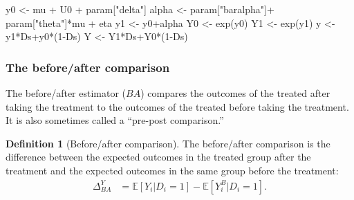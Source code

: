 \documentclass[
]{book}
\newenvironment{Shaded}{\begin{snugshade}}{\end{snugshade}}
\newcommand{\DecValTok}[1]{\textcolor[rgb]{0.00,0.00,0.81}{#1}}
\newcommand{\FunctionTok}[1]{\textcolor[rgb]{0.00,0.00,0.00}{#1}}
\newcommand{\NormalTok}[1]{#1}
\newcommand{\OtherTok}[1]{\textcolor[rgb]{0.56,0.35,0.01}{#1}}
\newcommand{\SpecialCharTok}[1]{\textcolor[rgb]{0.00,0.00,0.00}{#1}}
\newcommand{\StringTok}[1]{\textcolor[rgb]{0.31,0.60,0.02}{#1}}
\newcommand{\esp}[1]{\mathbb{E}[ #1 ]}
\theoremstyle{definition}
\newtheorem{definition}{Definition}[chapter]
\theoremstyle{definition}
\theoremstyle{definition}
\theoremstyle{definition}
\theoremstyle{remark}
\begin{document}
\begin{Shaded}
\begin{Highlighting}[]
\NormalTok{y0 }\OtherTok{\textless{}{-}}\NormalTok{ mu }\SpecialCharTok{+}\NormalTok{  U0 }\SpecialCharTok{+}\NormalTok{ param[}\StringTok{"delta"}\NormalTok{]}
\NormalTok{alpha }\OtherTok{\textless{}{-}}\NormalTok{ param[}\StringTok{"baralpha"}\NormalTok{]}\SpecialCharTok{+}\NormalTok{  param[}\StringTok{"theta"}\NormalTok{]}\SpecialCharTok{*}\NormalTok{mu }\SpecialCharTok{+}\NormalTok{ eta}
\NormalTok{y1 }\OtherTok{\textless{}{-}}\NormalTok{ y0}\SpecialCharTok{+}\NormalTok{alpha}
\NormalTok{Y0 }\OtherTok{\textless{}{-}} \FunctionTok{exp}\NormalTok{(y0)}
\NormalTok{Y1 }\OtherTok{\textless{}{-}} \FunctionTok{exp}\NormalTok{(y1)}
\NormalTok{y }\OtherTok{\textless{}{-}}\NormalTok{ y1}\SpecialCharTok{*}\NormalTok{Ds}\SpecialCharTok{+}\NormalTok{y0}\SpecialCharTok{*}\NormalTok{(}\DecValTok{1}\SpecialCharTok{{-}}\NormalTok{Ds)}
\NormalTok{Y }\OtherTok{\textless{}{-}}\NormalTok{ Y1}\SpecialCharTok{*}\NormalTok{Ds}\SpecialCharTok{+}\NormalTok{Y0}\SpecialCharTok{*}\NormalTok{(}\DecValTok{1}\SpecialCharTok{{-}}\NormalTok{Ds)}
\end{Highlighting}
\end{Shaded}

\hypertarget{the-beforeafter-comparison}{%
\subsubsection{The before/after comparison}\label{the-beforeafter-comparison}}

The before/after estimator (\(BA\)) compares the outcomes of the treated after taking the treatment to the outcomes of the treated before taking the treatment.
It is also sometimes called a ``pre-post comparison.''

\begin{definition}[Before/after comparison]
\protect\hypertarget{def:unnamed-chunk-24}{}{\label{def:unnamed-chunk-24} \iffalse (Before/after comparison) \fi{} }The before/after comparison is the difference between the expected outcomes in the treated group after the treatment and the expected outcomes in the same group before the treatment:
\begin{align*}
\Delta^Y_{BA} & =  \esp{Y_i|D_i=1}-\esp{Y^B_i|D_i=1}.
\end{align*}
\end{definition}
\end{document}
